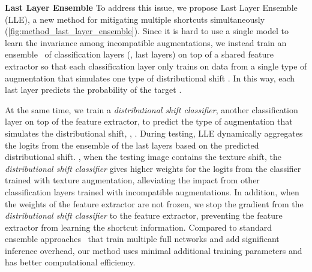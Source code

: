 \documentclass[10pt,twocolumn,letterpaper]{article}
\begin{document}
\noindent \textbf{Last Layer Ensemble} \quad To address this issue, we propose Last Layer Ensemble (LLE), a new method for mitigating multiple shortcuts simultaneously (\cref{fig:method_last_layer_ensemble}). Since it is hard to use a single model to learn the invariance among incompatible augmentations, we instead train an ensemble~\cite{dietterich2000Mult.Classif.Syst.Ensemble} of classification layers (\ie, last layers) on top of a shared feature extractor so that each classification layer only trains on data from a single type of augmentation that simulates one type of distributional shift . In this way, each last layer predicts the probability of the target .

At the same time, we train a \textit{distributional shift classifier}, another classification layer on top of the feature extractor, to predict the type of augmentation that simulates the distributional shift, \ie, .
During testing, LLE dynamically aggregates the logits from the ensemble of the last layers based on the predicted distributional shift. \Eg, when the testing image contains the texture shift, the \textit{distributional shift classifier} gives higher weights for the logits from the classifier trained with texture augmentation, alleviating the impact from other classification layers trained with incompatible augmentations. In addition, when the weights of the feature extractor are not frozen, we stop the gradient from the \textit{distributional shift classifier} to the feature extractor, preventing the feature extractor from learning the shortcut information. Compared to standard ensemble approaches~\cite{dietterich2000Mult.Classif.Syst.Ensemble} that train multiple full networks and add significant inference overhead, our method uses minimal additional training parameters and has better computational efficiency.
\end{document}
